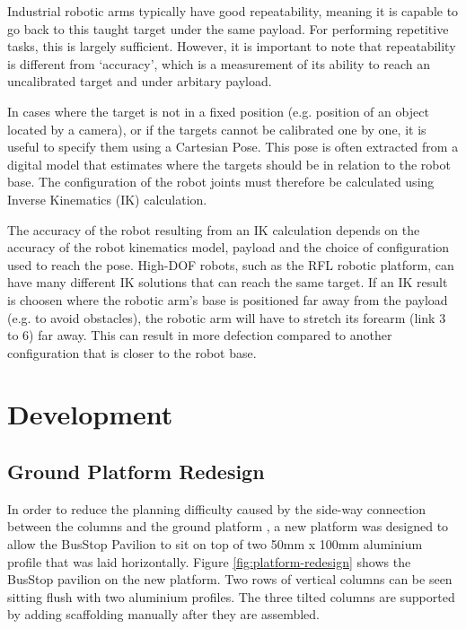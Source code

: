 Industrial robotic arms typically have good repeatability, meaning it is capable to go back to this taught target under the same payload. For performing repetitive tasks, this is largely sufficient. However, it is important to note that repeatability is different from ‘accuracy’, which is a measurement of its ability to reach an uncalibrated target and under arbitary payload. 

In cases where the target is not in a fixed position (e.g. position of an object located by a camera), or if the targets cannot be calibrated one by one, it is useful to specify them using a Cartesian Pose. This pose is often extracted from a digital model that estimates where the targets should be in relation to the robot base. The configuration of the robot joints must therefore be calculated using Inverse Kinematics (IK) calculation. 

The accuracy of the robot resulting from an IK calculation depends on the accuracy of the robot kinematics model, payload and the choice of configuration used to reach the pose. High-DOF robots, such as the RFL robotic platform, can have many different IK solutions that can reach the same target. If an IK result is choosen where the robotic arm's base is positioned far away from the payload (e.g. to avoid obstacles), the robotic arm will have to stretch its forearm (link 3 to 6) far away. This can result in more defection compared to another configuration that is closer to the robot base. 

\FloatBarrier

\section{Development}
\label{section:exploration-3-development}

\subsection{Ground Platform Redesign}
\label{subsection:exploration-3-ground-platform-redesign}

In order to reduce the planning difficulty caused by the side-way connection between the columns and the ground platform , a new platform was designed to allow the BusStop Pavilion to sit on top of two 50mm x 100mm aluminium profile that was laid horizontally. Figure \ref{fig:platform-redesign} shows the BusStop pavilion on the new platform. Two rows of vertical columns can be seen sitting flush with two aluminium profiles. The three tilted columns are supported by adding scaffolding manually after they are assembled.

